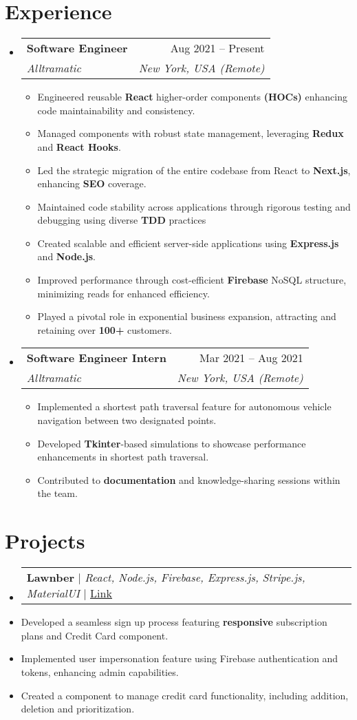 \documentclass[letterpaper,11pt]{article}
\makeatletter
\newcommand{\resumeItem}[1]{
  \item\small{
    {#1 \vspace{-2pt}}
  }
}
\newcommand{\resumeSubheading}[4]{
  \vspace{-2pt}\item
    \begin{tabular*}{0.97\textwidth}[t]{l@{\extracolsep{\fill}}r}
      \textbf{#1} & #2 \\
      \textit{\small#3} & \textit{\small #4} \\
    \end{tabular*}\vspace{-7pt}
}
\newcommand{\resumeProjectHeading}[2]{
    \item
    \begin{tabular*}{0.97\textwidth}{l@{\extracolsep{\fill}}r}
      \small#1 & #2 \\
    \end{tabular*}\vspace{-7pt}
}
\newcommand{\resumeSubHeadingListStart}{\begin{itemize}[leftmargin=0.15in, label={}]}
\newcommand{\resumeSubHeadingListEnd}{\end{itemize}}
\newcommand{\resumeItemListStart}{\begin{itemize}}
\newcommand{\resumeItemListEnd}{\end{itemize}\vspace{-5pt}}
\makeatother
\begin{document}
\section{Experience}
\resumeSubHeadingListStart
\resumeSubheading
{Software Engineer}{Aug 2021 -- Present}
{Alltramatic}{New York, USA (Remote)}
\resumeItemListStart
\resumeItem{Engineered reusable \textbf{React} higher-order components \textbf{(HOCs)} enhancing code maintainability and consistency. 
}
\resumeItem{Managed components with robust state management, leveraging \textbf{Redux} and \textbf{React Hooks}.}
\resumeItem{Led the strategic migration of the entire codebase from React to \textbf{Next.js}, enhancing \textbf{SEO} coverage.}
\resumeItem{Maintained code stability across applications through rigorous testing and debugging using diverse \textbf{TDD} practices}
\resumeItem{Created scalable and efficient server-side applications using \textbf{Express.js} and \textbf{Node.js}.}
\resumeItem{Improved performance through cost-efficient \textbf{Firebase} NoSQL structure, minimizing reads for enhanced efficiency.}
\resumeItem{Played a pivotal role in exponential business expansion, attracting and retaining over \textbf{100+} customers.}
\resumeItemListEnd
\vspace{5pt} %

\resumeSubheading
{Software Engineer Intern}{Mar 2021 -- Aug 2021}
{Alltramatic}{New York, USA (Remote)}
\resumeItemListStart
\resumeItem{Implemented a shortest path traversal feature for autonomous vehicle navigation between two designated points.}
\resumeItem{Developed \textbf{Tkinter}-based simulations to showcase performance enhancements in shortest path traversal.}
\resumeItem{Contributed to \textbf{documentation} and knowledge-sharing sessions within the team.}
\resumeItemListEnd
\resumeSubHeadingListEnd



\section{Projects}
    \resumeSubHeadingListStart
   
      \resumeProjectHeading
        {\textbf{Lawnber} $|$ \emph{React, Node.js, Firebase, Express.js, Stripe.js, MaterialUI} $|$ \hfill \href{https://lawnber.com}{\underline{Link}}}


          \resumeItemListStart
           \resumeItem{Developed a seamless sign up process featuring \textbf{responsive} subscription plans and Credit Card component. }
           \resumeItem{Implemented user impersonation feature using Firebase authentication and tokens, enhancing admin capabilities.}
            \resumeItem{Created a component to manage credit card functionality, including addition, deletion and prioritization.}
          \resumeItemListEnd
          
\end{document}
